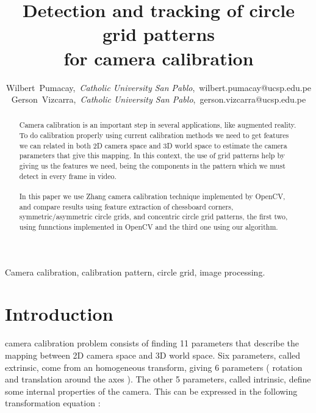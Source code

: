 \documentclass[journal]{IEEEtran}
\begin{document}
\title{Detection and tracking of circle grid patterns \\ for camera calibration}

\author{Wilbert~Pumacay,~\textit{Catholic University San Pablo},~wilbert.pumacay@ucsp.edu.pe\\
        Gerson~Vizcarra,~\textit{Catholic University San Pablo},~gerson.vizcarra@ucsp.edu.pe}

\maketitle

\begin{abstract}
Camera calibration is an important step in several applications, like augmented reality. To do calibration properly using current calibration methods we need to get features we can related in both 2D camera space and 3D world space to estimate the camera parameters that give this mapping. In this context, the use of grid patterns help by giving us the features we need, being the components in the pattern which we must detect in every frame in video.
\\
\\
In this paper we use Zhang camera calibration technique implemented by OpenCV, and compare results using feature extraction of chessboard corners, symmetric/asymmetric circle grids, and concentric circle grid patterns, the first two, using funnctions implemented in OpenCV and the third one using our algorithm.
\end{abstract}

\begin{IEEEkeywords}
Camera calibration, calibration pattern, circle grid, image processing.
\end{IEEEkeywords}


\section{Introduction}

 camera calibration problem consists of finding 11 parameters that describe the mapping between 2D camera space and 3D world space. Six parameters, called extrinsic, come from an homogeneous transform, giving 6 parameters ( rotation and translation around the axes ). The other 5 parameters, called intrinsic, define some internal properties of the camera. This can be expressed in the following transformation equation :
\end{document}
